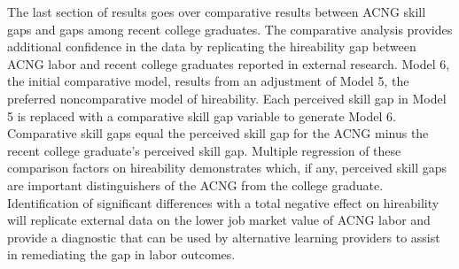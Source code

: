 \documentclass[review]{elsarticle}
\begin{document}
The last section of results goes over comparative results between ACNG skill gaps and gaps among recent college graduates.
The comparative analysis provides additional confidence in the data by replicating the hireability gap between ACNG labor and recent college graduates reported in external research.
Model 6, the initial comparative model, results from an adjustment of Model 5, the preferred noncomparative model of hireability.
Each perceived skill gap in Model 5 is replaced with a comparative skill gap variable to generate Model 6.
Comparative skill gaps equal the perceived skill gap for the ACNG minus the recent college graduate's perceived skill gap.
Multiple regression of these comparison factors on hireability demonstrates which, if any, perceived skill gaps are important distinguishers of the ACNG from the college graduate.
Identification of significant differences with a total negative effect on hireability will replicate external data on the lower job market value of ACNG labor
and provide a diagnostic that can be used by alternative learning providers to assist in remediating the gap in labor outcomes.


\end{document}
